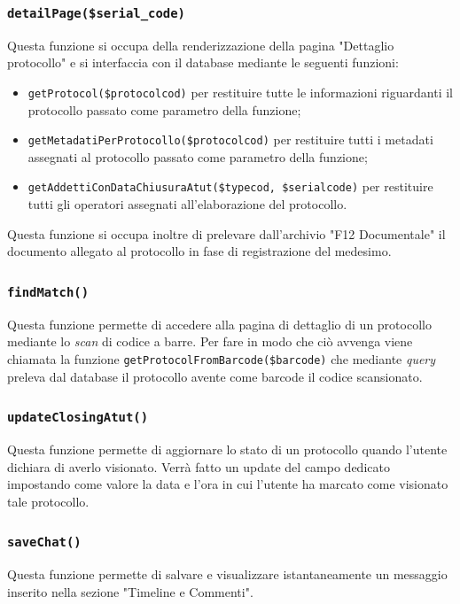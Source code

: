     \subsubsection{\texttt{detailPage(\$serial\_code)}}
    Questa funzione si occupa della renderizzazione della pagina "Dettaglio protocollo" e si interfaccia con il database mediante le seguenti funzioni:
    \begin{itemize}
        \item \texttt{getProtocol(\$protocolcod)} per restituire tutte le informazioni riguardanti il protocollo passato come parametro della funzione;
        
        \item \texttt{getMetadatiPerProtocollo(\$protocolcod)} per restituire tutti i metadati assegnati al protocollo passato come parametro della funzione;
        
        \item \texttt{getAddettiConDataChiusuraAtut(\$typecod, \$serialcode)} per restituire tutti gli operatori assegnati all'elaborazione del protocollo.
    \end{itemize}
    Questa funzione si occupa inoltre di prelevare dall'archivio "F12 Documentale" il documento allegato al protocollo in fase di registrazione del medesimo.
    
    \subsubsection{\texttt{findMatch()}}
    Questa funzione permette di accedere alla pagina di dettaglio di un protocollo mediante lo \textit{scan} di codice a barre. Per fare in modo che ciò avvenga viene chiamata la funzione \texttt{getProtocolFromBarcode(\$barcode)} che mediante \textit{query} preleva dal database il protocollo avente come barcode il codice scansionato.
    
    \subsubsection{\texttt{updateClosingAtut()}}
    Questa funzione permette di aggiornare lo stato di un protocollo quando l'utente dichiara di averlo visionato. Verrà fatto un update del campo dedicato impostando come valore la data e l'ora in cui l'utente ha marcato come visionato tale protocollo.
    
    \subsubsection{\texttt{saveChat()}}
    Questa funzione permette di salvare e visualizzare istantaneamente un messaggio inserito nella sezione "Timeline e Commenti".
    

